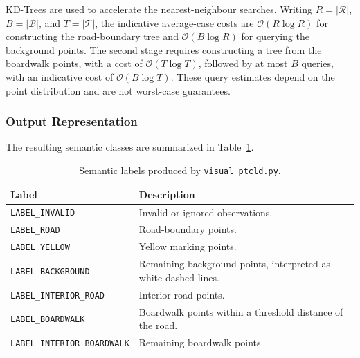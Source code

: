 \documentclass[a4paper,11pt,oneside]{book}
\begin{document}
KD-Trees are used to accelerate the nearest-neighbour searches.
Writing $R=|\mathcal{R}|$, $B=|\mathcal{B}|$, and
$T=|\mathcal{T}|$, the indicative average-case costs are
$\mathcal{O}(R\log R)$ for constructing the road-boundary tree
and $\mathcal{O}(B\log R)$ for querying the background points.
The second stage requires constructing a tree from the
boardwalk points, with a cost of $\mathcal{O}(T\log T)$,
followed by at most $B$ queries, with an indicative cost of
$\mathcal{O}(B\log T)$. These query estimates depend on the
point distribution and are not worst-case guarantees.


\subsubsection{Output Representation}

The resulting semantic classes are summarized in
Table~\ref{tab:visual_ptcld_labels}.

\begin{table}[H]
    \centering
    \small
    \begin{tabular}{lp{}}
        \toprule
        \textbf{Label} & \textbf{Description} \\
        \midrule
        \texttt{LABEL\_INVALID}
        & Invalid or ignored observations. \\

        \texttt{LABEL\_ROAD}
        & Road-boundary points. \\

        \texttt{LABEL\_YELLOW}
        & Yellow marking points. \\

        \texttt{LABEL\_BACKGROUND}
        & Remaining background points, interpreted as
        white dashed lines. \\

        \texttt{LABEL\_INTERIOR\_ROAD}
        & Interior road points. \\

        \texttt{LABEL\_BOARDWALK}
        & Boardwalk points within a threshold distance
        of the road. \\

        \texttt{LABEL\_INTERIOR\_BOARDWALK}
        & Remaining boardwalk points. \\
        \bottomrule
    \end{tabular}
    \caption{Semantic labels produced by
    \texttt{visual\_ptcld.py}.}
    \label{tab:visual_ptcld_labels}
\end{table}
\end{document}
